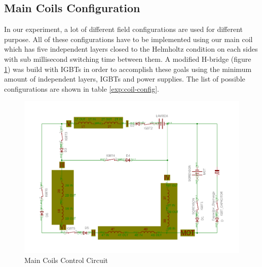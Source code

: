 \subsection{Main Coils Configuration}\label{exp:coil}
In our experiment, a lot of different field configurations are used for different purpose. All of these configurations have to be implemented using our main coil which has five independent layers closed to the Helmholtz condition on each sides with sub millisecond switching time between them. A modified H-bridge (figure \ref{exp:coil-control}) was build with IGBTs in order to accomplish these goals using the minimum amount of independent layers, IGBTs and power supplies. The list of possible configurations are shown in table \ref{exp:coil-config}.
\begin{figure}
  \begin{center}
    \includegraphics[width=12cm]{BEC5_coils.pdf}
  \end{center}
  \caption{Main Coils Control Circuit}
  \label{exp:coil-control}
\end{figure}

